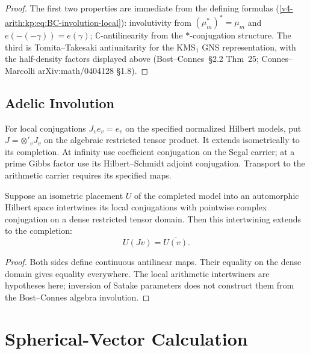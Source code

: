 \begin{proof}
The first two properties are immediate from the defining formulas
(\ref{v4-arith:kp:eq:BC-involution-local}): involutivity from
\((\mu_{m}^{*})^{*}=\mu_{m}\) and \(e(-(-\gamma))=e(\gamma)\);
\(\mathbb{C}\)-antilinearity from the \(*\)-conjugation structure.
The third is Tomita--Takesaki antiunitarity for the KMS\({}_{1}\)
GNS representation, with the half-density factors displayed above
(Bost--Connes~\S2.2 Thm~25; Connes--Marcolli
arXiv:math/0404128 \S1.8).
\end{proof}

\subsection{Adelic Involution}
\label{v4-arith:kp:BC-involution:adelic}

\begin{definition}
\label{v4-arith:kp:def:adelic-involution}
For local conjugations \(J_ve_v=e_v\) on the specified normalized
Hilbert models, put \(J=\otimes'_v J_v\) on the algebraic restricted
tensor product. It extends isometrically to its completion.
At infinity use coefficient conjugation on the Segal carrier; at a
prime Gibbs factor use its Hilbert--Schmidt adjoint conjugation.
Transport to the arithmetic carrier requires its specified maps.
\end{definition}
\begin{proposition}
\label{v4-arith:kp:prop:involution-conjugation}
Suppose an isometric placement \(U\) of the completed model into
an automorphic Hilbert space intertwines its local conjugations with
pointwise complex conjugation on a dense restricted tensor domain.
Then this intertwining extends to the completion:
\begin{equation}
\label{v4-arith:kp:eq:involution-conjugation}
 U(Jv)=\overline{U(v)}.
\end{equation}
\end{proposition}
\begin{proof}
Both sides define continuous antilinear maps. Their equality on the
dense domain gives equality everywhere. The local arithmetic
intertwiners are hypotheses here; inversion of Satake parameters
does not construct them from the Bost--Connes algebra involution.
\end{proof}

\section{Spherical-Vector Calculation}
\label{v4-arith:kp:spherical-calc}

